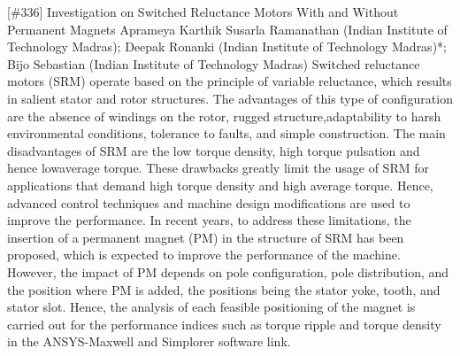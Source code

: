 {} \begin{abstract_online} {[\#336] Investigation on Switched Reluctance Motors With and Without Permanent Magnets} {} {Aprameya Karthik Susarla Ramanathan (Indian Institute of Technology Madras); Deepak  Ronanki (Indian Institute of Technology Madras)*; Bijo Sebastian (Indian Institute of Technology Madras)} {} Switched reluctance motors (SRM) operate based on the principle of variable reluctance, which results in salient stator and rotor structures. The advantages of this type of configuration are the absence of windings on the rotor, rugged structure,adaptability to harsh environmental conditions, tolerance to faults, and simple construction. The main disadvantages of SRM are the low torque density, high torque pulsation and hence lowaverage torque. These drawbacks greatly limit the usage of SRM for applications that demand high torque density and high average torque. Hence, advanced control techniques and machine design modifications are used to improve the performance. In recent years, to address these limitations, the insertion of a permanent magnet (PM) in the structure of SRM has been proposed, which is expected to improve the performance of the machine. However, the impact of PM depends on pole configuration, pole distribution, and the position where PM is added, the positions being the stator yoke, tooth, and stator slot. Hence, the analysis of each feasible positioning of the magnet is carried out for the performance indices such as torque ripple and torque density in the ANSYS-Maxwell and Simplorer software link. \end{abstract_online} 
